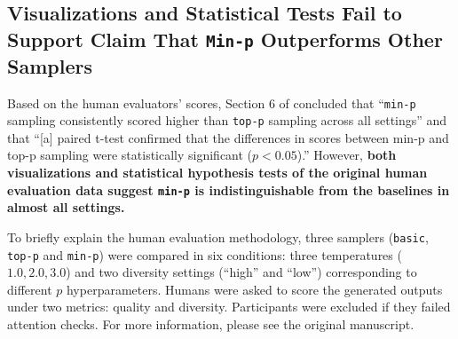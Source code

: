 \subsection{Visualizations and Statistical Tests Fail to Support Claim That \texttt{Min-p} Outperforms Other Samplers}
\label{sec:human_evals:subsec:human_scores}

Based on the human evaluators' scores, Section 6 of \citet{nguyen2024minp} concluded that ``\texttt{min-p} sampling consistently scored higher than \texttt{top-p} sampling across all settings'' and that ``[a] paired t-test confirmed that the differences in scores between min-p and top-p sampling were statistically significant ($p < 0.05$).''
However, \textbf{both visualizations and statistical hypothesis tests of the original human evaluation data suggest \texttt{min-p} is indistinguishable from the baselines in almost all settings.}

To briefly explain the human evaluation methodology, three samplers (\texttt{basic}, \texttt{top-p} and \texttt{min-p}) were compared in six conditions: three temperatures ($1.0, 2.0, 3.0$) and two diversity settings (``high'' and ``low'') corresponding to different $p$ hyperparameters.
Humans were asked to score the generated outputs under two metrics: quality and diversity.
Participants were excluded if they failed attention checks.
For more information, please see the original manuscript.

